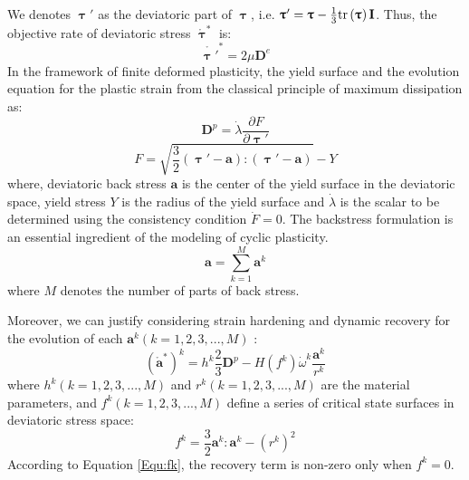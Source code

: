 We denotes $\bm{\uptau}'$ as the deviatoric part of $\bm{\uptau}$, i.e. ${\bm{\uptau}}' = {\bm{\uptau }} - \frac{1}{3}{\rm{tr}}\left( {\bm{\uptau }} \right){\mathbf{I}}$.
Thus, the objective rate of deviatoric stress ${\mathring {\bm{\uptau }}^{*}}$ is:
\begin{equation}
{\mathring {\bm{\uptau'}}^{*}} = 2\mu {{\mathbf{D}}^e}
\end{equation}
In the framework of finite deformed plasticity, the yield surface and the evolution equation for the plastic strain from the classical principle of maximum dissipation as:
\begin{equation}
{{{\mathbf{D}}^p}} = \dot \lambda \frac{{\partial F}}{{\partial {\bm{\uptau }'}}}
\end{equation}
\begin{equation}
F = \sqrt {\frac{3}{2}\left( {{\bm{\uptau}}' - {\mathbf{a}}} \right):\left( {{\bm{\uptau}}' - {\mathbf{a}}} \right)}  - Y
\end{equation}
where, deviatoric back stress ${\mathbf{a}}$ is the center of the yield surface in the deviatoric space, yield stress $Y$ is the radius of the yield surface and $\dot \lambda$ is the scalar to be determined using the consistency condition $\dot F = 0$.
The backstress formulation is an essential ingredient of the modeling of cyclic plasticity.
\begin{equation}
{\mathbf{a}} = \sum\limits_{k = 1}^M {{{\mathbf{a}}^k}}
\end{equation}
where $M$ denotes the number of parts of back stress.

Moreover, we can justify considering strain hardening and dynamic recovery for the evolution of each ${{\mathbf{a}}^k} ( k = 1,2,3,...,M )$ :
\begin{equation}
\label{Equ:dotak1}
\left({\mathbf{\mathring a}}^{*}\right)^k = {h^k}\frac{2}{3}{{{\mathbf{D}}^p}} - H\left( {{f^k}} \right){\dot \omega ^k}\frac{{{{\mathbf{a}}^k}}}{{{r^k}}}
\end{equation}
where ${{{h}}^k} ( k = 1,2,3,...,M )$ and ${{{r}}^k} ( k = 1,2,3,...,M )$ are the material parameters, and ${{{f}}^k} ( k = 1,2,3,...,M )$ define a series of critical state surfaces in deviatoric stress space:
\begin{equation}
\label{Equ:fk}
{f^k} = \frac{3}{2}{{\mathbf{a}}^k}:{{\mathbf{a}}^k} - {\left( {{r^k}} \right)^2}
\end{equation}
According to Equation \ref{Equ:fk}, the recovery term is non-zero only when ${f^k} = 0$.

